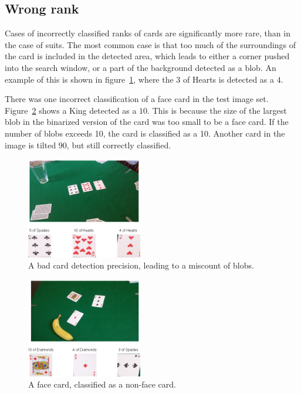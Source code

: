 \documentclass[journal,twoside]{IEEEtran}
\begin{document}
\subsection{Wrong rank}

Cases of incorrectly classified ranks of cards are significantly more rare, than in the case of suits. The most common case is that too much of the surroundings of the card is included in the detected area, which leads to either a corner pushed into the search window, or a part of the background detected as a blob. An example of this is shown in figure~\ref{fig:error20}, where the $3$ of Hearts is detected as a $4$.

There was one incorrect classification of a face card in the test image set. Figure~\ref{fig:error4} shows a King detected as a $10$. This is because the size of the largest blob in the binarized version of the card was too small to be a face card. If the number of blobs exceeds 10, the card is classified as a 10. Another card in the image is tilted $90$\degree, but still correctly classified.

\begin{figure}[placement h]
\centering
\includegraphics[width=0.45\textwidth]{images/testResults/20.png}
\caption{A bad card detection precision, leading to a miscount of blobs.}
\label{fig:error20}
\end{figure}

\begin{figure}[placement h]
\centering
\includegraphics[width=0.45\textwidth]{images/testResults/4.png}
\caption{A face card, classified as a non-face card.}
\label{fig:error4}
\end{figure}
\end{document}
